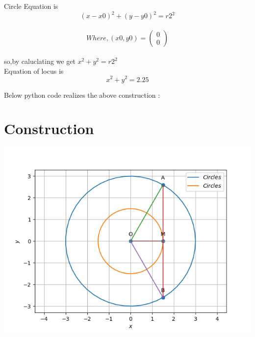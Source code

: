 \documentclass[10pt,a4paper]{report}
\newcommand{\myvec}[1]{\ensuremath{\begin{pmatrix}#1\end{pmatrix}}}
\begin{document}
\begin{multicols}{2}
   Circle Equation is \\
   \begin{equation} 
     (x-x0)^2+(y-y0)^2=r2^2
   \end{equation}\\ 
   \begin{equation} 
   Where, (x0,y0)=\myvec{0\\0} 
  \end{equation} \\
  so,by caluclating we get
   $x^2+y^2= r2^2$ \\
   Equation of locus is
   \begin{equation}
    x^2+y^2= 2.25
   \end{equation}
   
 \begin{center}
Below python code realizes the above construction : 
\end{center}
 \section{Construction}
   \begin{center}
  \includegraphics[scale=0.5]{Fig.png}
    \end{center}
\vspace{3cm}
\end{multicols}
\end{document}

